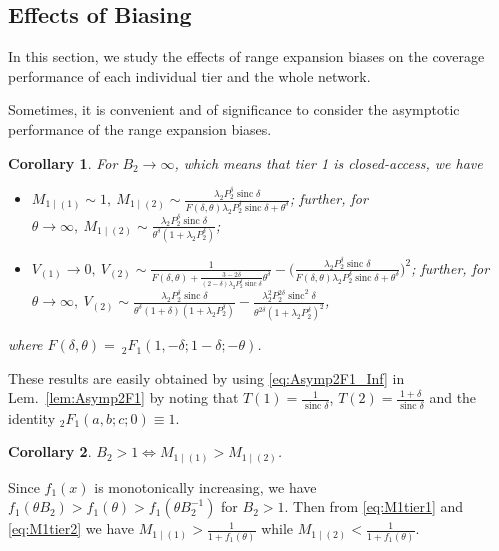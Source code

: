\documentclass[12pt,draftclsnofoot,journal,onecolumn]{IEEEtran}
\def\sinc{\operatorname{sinc}}
\newtheorem{corollary}{Corollary}
\begin{document}
\subsection{Effects of Biasing} 
In this section, we study the effects of range expansion biases on the coverage performance of each individual tier and the whole network. 
 
Sometimes, it is convenient and of significance to consider the asymptotic performance of the range expansion biases.
\begin{corollary}\label{cor:AsympB2}
	For $B_2\to \infty$, which means that tier 1 is closed-access, we have
	\begin{itemize}[\rm (a)]
		\item[\rm (a)] $\displaystyle M_{1\mid (1)}\sim 1,~ M_{1\mid (2)}\sim \frac{\lambda_2 P_2^\delta \sinc\delta}{F(\delta,\theta)\lambda_2 P_2^\delta \sinc\delta + \theta^\delta}$; further, for $\displaystyle \theta\to\infty,~ M_{1\mid (2)}\sim \frac{\lambda_2 P_2^\delta \sinc\delta}{\theta^\delta(1+\lambda_2 P_2^\delta)}$;
		\vspace{2pt}
		\item[\rm (b)] $\displaystyle V_{(1)}\to 0,~ V_{(2)}\sim \frac{1}{F(\delta,\theta)+\frac{3-2\delta}{(2-\delta)\lambda_2 P_2^\delta \sinc\delta}\theta^\delta}-\Big(\frac{\lambda_2 P_2^\delta \sinc\delta}{F(\delta,\theta)\lambda_2 P_2^\delta \sinc\delta + \theta^\delta}\Big)^2$; further, for $\displaystyle \theta\to\infty,~ V_{(2)}\sim \frac{\lambda_2 P_2^\delta \sinc\delta}{\theta^\delta (1+\delta)(1+\lambda_2 P_2^\delta)} - \frac{\lambda_2^2 P_2^{2\delta} \sinc^2\delta}{\theta^{2\delta} (1+\lambda_2 P_2^\delta)^2}$,
	\end{itemize}
	where $F(\delta,\theta)=\:_2F_1(1,-\delta; 1-\delta; -\theta)$. 
\end{corollary}
\begin{IEEEproof}
	These results are easily obtained by using \eqref{eq:Asymp2F1_Inf} in Lem.~\ref{lem:Asymp2F1} by noting that $T(1)=\frac{1}{\sinc\delta}$, $T(2)=\frac{1+\delta}{\sinc\delta}$ and the identity $_2F_1(a, b; c; 0)\equiv 1$.
\end{IEEEproof}

\begin{corollary}\label{cor:EffectBiasM1}
$B_2>1 \Leftrightarrow M_{1\mid (1)}>M_{1\mid (2)}$. 
\end{corollary}
\begin{IEEEproof}
   Since $f_1(x)$ is monotonically increasing, we have $f_1(\theta B_2)>f_1(\theta)>f_1(\theta B_2^{-1})$ for $B_2>1$. Then from \eqref{eq:M1tier1} and \eqref{eq:M1tier2} we have $M_{1\mid (1)}>\frac{1}{1+f_1(\theta)}$ while $M_{1\mid (2)}<\frac{1}{1+f_1(\theta)}$.
\end{IEEEproof}
\end{document}
